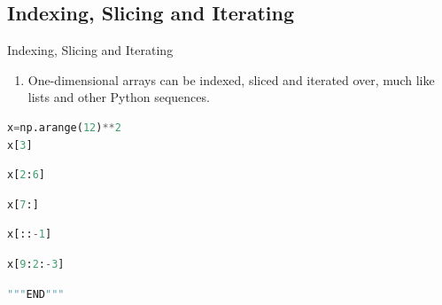 \documentclass[ignorenonframetext,11pt,xcolor=dvipsnames,hyperref={colorlinks,allcolors=.,urlcolor=blue, citecolor=violet, bookmarksdepth=4},aspectratio=1610]{beamer}
\providecommand{\tightlist}{%
  \setlength{\itemsep}{0pt}\setlength{\parskip}{0pt}}
\begin{document}
\hypertarget{indexing-slicing-and-iterating}{%
\subsection{Indexing, Slicing and
Iterating}\label{indexing-slicing-and-iterating}}

\begin{frame}[fragile]{Indexing, Slicing and Iterating}
\protect\hypertarget{indexing-slicing-and-iterating-1}{}

\begin{enumerate}
\tightlist
\item
  One-dimensional arrays can be indexed, sliced and iterated over, much
  like lists and other Python sequences.
\end{enumerate}

\begin{lstlisting}[language=Python]
x=np.arange(12)**2
x[3]
\end{lstlisting}

\begin{lstlisting}[language=Python]
x[2:6]
\end{lstlisting}

\begin{lstlisting}[language=Python]
x[7:]
\end{lstlisting}

\begin{lstlisting}[language=Python]
x[::-1]
\end{lstlisting}

\begin{lstlisting}[language=Python]
x[9:2:-3]
\end{lstlisting}

\begin{lstlisting}[language=Python]
"""END"""
\end{lstlisting}

\end{frame}
\end{document}
